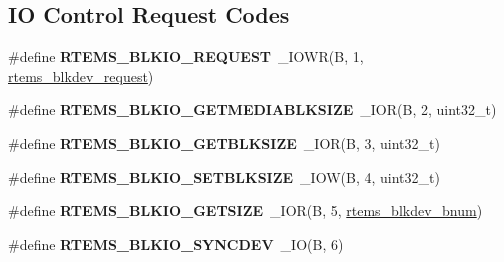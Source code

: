 \subsection*{IO Control Request Codes}
\begin{DoxyCompactItemize}
\item 
\mbox{\label{group__rtems__blkdev_ga86e35845b31fe29df9713374bcbd6411}} 
\#define {\bfseries R\+T\+E\+M\+S\+\_\+\+B\+L\+K\+I\+O\+\_\+\+R\+E\+Q\+U\+E\+ST}~\+\_\+\+I\+O\+WR(\textquotesingle{}B\textquotesingle{}, 1, \mbox{\hyperlink{structrtems__blkdev__request}{rtems\+\_\+blkdev\+\_\+request}})
\item 
\mbox{\label{group__rtems__blkdev_ga2d83b2b3ae01f5de3144ed98e6718a0d}} 
\#define {\bfseries R\+T\+E\+M\+S\+\_\+\+B\+L\+K\+I\+O\+\_\+\+G\+E\+T\+M\+E\+D\+I\+A\+B\+L\+K\+S\+I\+ZE}~\+\_\+\+I\+OR(\textquotesingle{}B\textquotesingle{}, 2, uint32\+\_\+t)
\item 
\mbox{\label{group__rtems__blkdev_ga723541bc5fa6d7d34ae7c75c01ca97fb}} 
\#define {\bfseries R\+T\+E\+M\+S\+\_\+\+B\+L\+K\+I\+O\+\_\+\+G\+E\+T\+B\+L\+K\+S\+I\+ZE}~\+\_\+\+I\+OR(\textquotesingle{}B\textquotesingle{}, 3, uint32\+\_\+t)
\item 
\mbox{\label{group__rtems__blkdev_gaf3d1317e63b50c8fe7cc2bf48a9d842b}} 
\#define {\bfseries R\+T\+E\+M\+S\+\_\+\+B\+L\+K\+I\+O\+\_\+\+S\+E\+T\+B\+L\+K\+S\+I\+ZE}~\+\_\+\+I\+OW(\textquotesingle{}B\textquotesingle{}, 4, uint32\+\_\+t)
\item 
\mbox{\label{group__rtems__blkdev_ga3ac396d5a7f0def87d64bc2621eb9f7e}} 
\#define {\bfseries R\+T\+E\+M\+S\+\_\+\+B\+L\+K\+I\+O\+\_\+\+G\+E\+T\+S\+I\+ZE}~\+\_\+\+I\+OR(\textquotesingle{}B\textquotesingle{}, 5, \mbox{\hyperlink{group__rtems__disk_ga5fbcfd40b657bff6c54d9e393fab3274}{rtems\+\_\+blkdev\+\_\+bnum}})
\item 
\mbox{\label{group__rtems__blkdev_gaeb94a19fb76fd7fe974a018aca089412}} 
\#define {\bfseries R\+T\+E\+M\+S\+\_\+\+B\+L\+K\+I\+O\+\_\+\+S\+Y\+N\+C\+D\+EV}~\+\_\+\+IO(\textquotesingle{}B\textquotesingle{}, 6)
\item 
\mbox{\label{group__rtems__blkdev_ga4b23063186bf53a369ab16430ac1a38a}} 

\end{DoxyCompactItemize}
